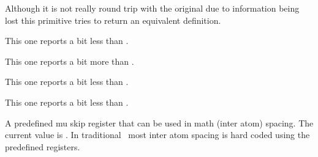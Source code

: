 Although it is not really round trip with the original due to information
being lost this primitive tries to return an equivalent definition.

\startbuffer
\tolerant\permanent\protected\gdef\foo[#1]#*[#2]{(#1)(#2)} \meaningasis\foo
\stopbuffer

\typebuffer \getbuffer

\stopnewprimitive

\startnewprimitive[title={\prm {meaningful}}]

This one reports a bit less than .

\startbuffer
\tolerant\permanent\protected\gdef\foo[#1]#*[#2]{(#1)(#2)} \meaningful\foo
\stopbuffer

\typebuffer \getbuffer

\stopnewprimitive

\startnewprimitive[title={\prm {meaningfull}}]

This one reports a bit more than .

\startbuffer
\tolerant\permanent\protected\gdef\foo[#1]#*[#2]{(#1)(#2)} \meaningfull\foo
\stopbuffer

\typebuffer \getbuffer

\stopnewprimitive

\startnewprimitive[title={\prm {meaningles}}]

This one reports a bit less than .

\startbuffer
\tolerant\permanent\protected\gdef\foo[#1]#*[#2]{(#1)(#2)} \meaningles\foo
\stopbuffer

\typebuffer \getbuffer

\stopnewprimitive

\startnewprimitive[title={\prm {meaningless}}]

This one reports a bit less than .

\startbuffer
\tolerant\permanent\protected\gdef\foo[#1]#*[#2]{(#1)(#2)} \meaningless\foo
\stopbuffer

\typebuffer \getbuffer

\stopnewprimitive

\startoldprimitive[title={\prm {medmuskip}}]

A predefined mu skip register that can be used in math (inter atom) spacing. The
current value is {\tt \the\medmuskip}. In traditional \TEX\ most inter atom
spacing is hard coded using the predefined registers.

\stopoldprimitive

